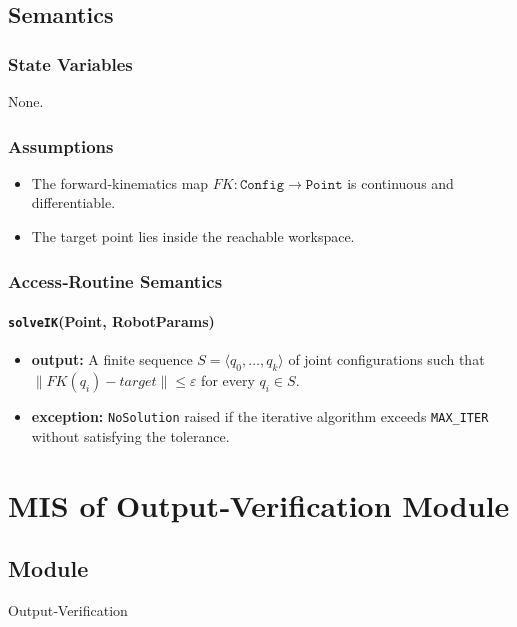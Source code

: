 \documentclass[12pt, titlepage]{article}
\begin{document}
\subsection{Semantics}
\subsubsection{State Variables}
None.

\subsubsection{Assumptions}
\begin{itemize}
  \item The forward‑kinematics map $FK:\texttt{Config}\rightarrow\texttt{Point}$ is continuous and differentiable.
  \item The target point lies inside the reachable workspace.
\end{itemize}

\subsubsection{Access‑Routine Semantics}

\paragraph{\texttt{solveIK}(Point, RobotParams)}
\begin{itemize}
  \item \textbf{output:} A finite sequence $S=\langle q_0,\dots,q_k\rangle$ of joint configurations such that
        $\|FK(q_i)-\textit{target}\|\le \varepsilon$ for every $q_i\in S$.
  \item \textbf{exception:} \texttt{NoSolution} raised if the iterative algorithm exceeds
        \texttt{MAX\_ITER} without satisfying the tolerance.
\end{itemize}


\newpage
\section{MIS of Output‑Verification Module}
\label{mod:verify}

\subsection{Module}
Output‑Verification
\end{document}
